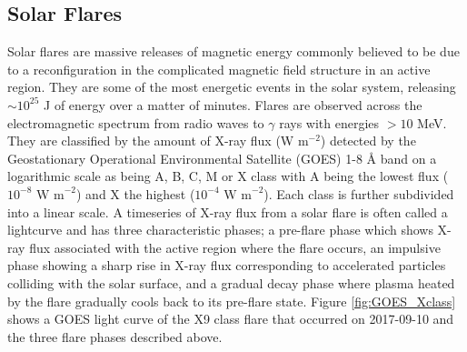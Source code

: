 
\subsection{Solar Flares}
\label{subsec:sf}
Solar flares are massive releases of magnetic energy commonly believed to be due to a reconfiguration in the complicated magnetic field structure in an active region.  They are some of the most energetic events in the solar system, releasing $\sim 10^{25}$ J of energy over a matter of minutes. Flares are observed across the electromagnetic spectrum from radio waves to $\gamma$ rays with energies $> 10$ MeV. They are classified by the amount of X-ray flux (W m$^{-2}$) detected by the Geostationary Operational Environmental Satellite (GOES) 1-8 {\AA} band on a logarithmic scale as being A, B, C, M or X class with A being the lowest flux ($10^{-8} \mbox{ W m}^{-2}$) and X the highest ($10^{-4} \mbox{ W m}^{-2}$). Each class is further subdivided into a linear scale.
A timeseries of X-ray flux from a solar flare is often called a lightcurve and has three characteristic phases; a pre-flare phase which shows X-ray flux associated with the active region where the flare occurs, an impulsive phase showing a sharp rise in X-ray flux corresponding to accelerated particles colliding with the solar surface, and a gradual decay phase where plasma heated by the flare gradually cools back to its pre-flare state. Figure \ref{fig:GOES_Xclass} shows a GOES light curve of the X9 class flare that occurred on 2017-09-10 and the three flare phases described above.

